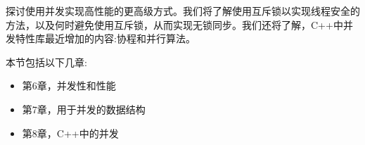 探讨使用并发实现高性能的更高级方式。我们将了解使用互斥锁以实现线程安全的方法，以及何时避免使用互斥锁，从而实现无锁同步。我们还将了解，C++中并发特性库最近增加的内容:协程和并行算法。

本节包括以下几章:

\begin{itemize}
\item 第6章，并发性和性能
\item 第7章，用于并发的数据结构
\item 第8章，C++中的并发
\end{itemize}


